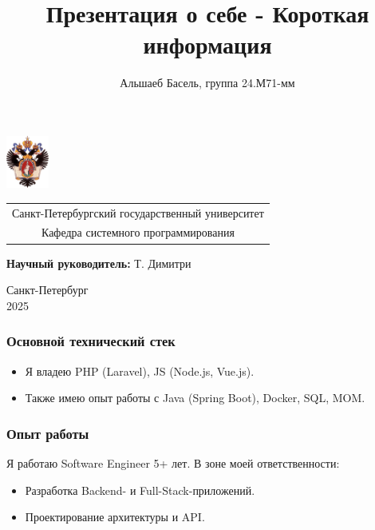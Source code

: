 \documentclass{beamer}
\title[Короткая информация]{Презентация о себе - Короткая информация}
\institute[СПбГУ]{\\ Курс "Управление проектами"}
\author[Альшаеб Басель]{Альшаеб Басель, группа 24.М71-мм}
\begin{document}
{
\begin{frame}
  \includegraphics[width=1.4cm]{pictures/SPbGU_Logo.png}
\vspace{-35pt}
\hspace{-10pt}
\begin{center}
   \begin{tabular}{c}
        \scriptsize{Санкт-Петербургский государственный университет} \\
        \scriptsize{Кафедра системного программирования}
    \end{tabular}
\titlepage
\end{center}

\btVFill

{\scriptsize
   \textbf{Научный руководитель:} Т. Димитри \\
 }
\begin{center}
  \vspace{5pt}
  \scriptsize{Санкт-Петербург\\
                 2025}
  \end{center}

\end{frame}
}

\begin{frame}[fragile]
  \frametitle{Основной технический стек}
  \begin{itemize}
    \item Я владею PHP (Laravel), JS (Node.js, Vue.js).
    \item Также имею опыт работы с Java (Spring Boot), Docker, SQL, MOM.
  \end{itemize}
\end{frame}

\begin{frame}[fragile]
  \frametitle{Опыт работы}
  Я работаю Software Engineer 5+ лет. В зоне моей ответственности:
  \begin{itemize}
    \item Разработка Backend- и Full-Stack-приложений.
    \item Проектирование архитектуры и API.
  \end{itemize}
\end{frame}
\end{document}
